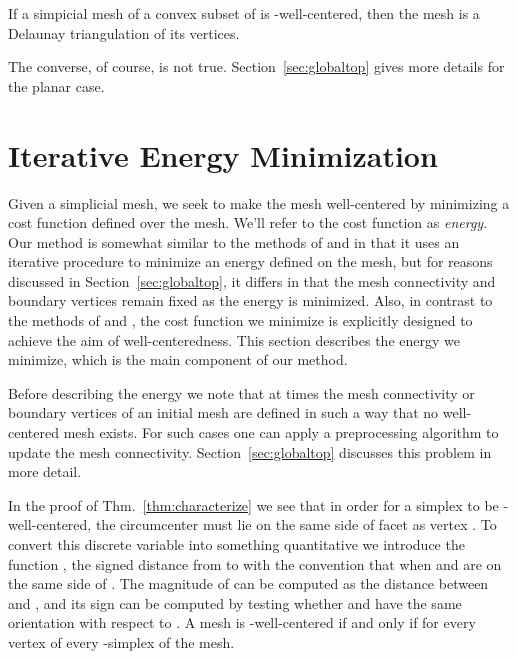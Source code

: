 \documentclass[final]{siamltex}
\begin{document}
\bigskip

\begin{corollary}
  \label{cor:Delaunay}
  If a simpicial mesh of a convex subset of  is
  -well-centered, then the mesh is a Delaunay triangulation of its
  vertices.
\end{corollary}

\bigskip

The converse, of course, is not true.  Section~\ref{sec:globaltop}
gives more details for the planar case.


\section{Iterative Energy Minimization}
\label{sec:iterative}
Given a simplicial mesh, we seek to make the mesh well-centered by
minimizing a cost function defined over the mesh. We'll refer to the
cost function as \emph{energy}. Our method is somewhat similar to the
methods of \cite{AlCoYvDe2005} and \cite{DuFaGu1999} in that it uses
an iterative procedure to minimize an energy defined on the mesh, but
for reasons discussed in Section~\ref{sec:globaltop}, it differs in that
the mesh connectivity and boundary vertices remain fixed as the energy
is minimized.  Also, in contrast to the methods of \cite{AlCoYvDe2005}
and \cite{DuFaGu1999}, the cost function we minimize is explicitly
designed to achieve the aim of well-centeredness.  This section
describes the energy we minimize, which is the main component of our
method.


Before describing the energy we note that at times the mesh
connectivity or boundary vertices of an initial mesh are defined in
such a way that no well-centered mesh exists.  For such cases one can
apply a preprocessing algorithm to update the mesh connectivity.
Section~\ref{sec:globaltop} discusses this problem in more detail.


In the proof of Thm.~\ref{thm:characterize} we see that in order for a
simplex  to be -well-centered, the circumcenter
 must lie on the same side of facet 
as vertex .  To convert this discrete variable into something
quantitative we introduce the function , the
signed distance from  to  with
the convention that  when 
and  are on the same side of .  The
magnitude of  can be computed as the distance
between  and , and its sign can be
computed by testing whether  and  have the same
orientation with respect to .
A mesh is -well-centered if and only
if  for every vertex
 of every -simplex  of the mesh.
\end{document}
